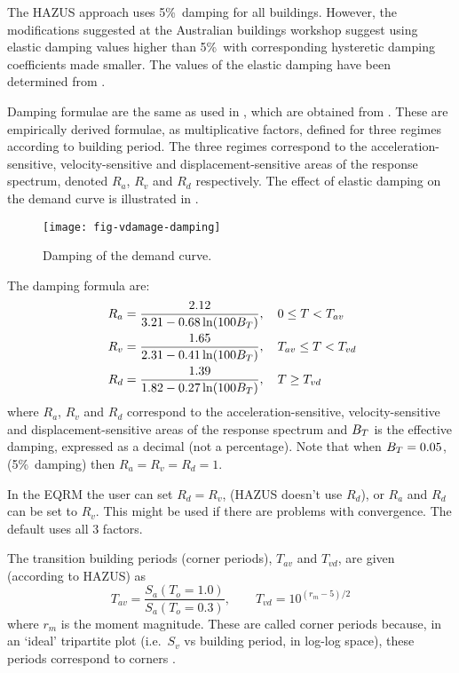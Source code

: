 The HAZUS approach uses 5\%\ damping for all buildings. However,
the modifications suggested at the Australian buildings workshop
\citep{dr_Stehle01a} suggest using elastic damping values higher
than 5\%\ with corresponding hysteretic damping coefficients made
smaller. The values of the elastic damping have been determined
from \cite{Newmark82}.

Damping formulae are the same as used in \cite{dr_FEMA99b}, which
are obtained from \cite{Newmark82}. These are empirically derived
formulae, as multiplicative factors, defined for three regimes
according to building period. The three regimes correspond to the
acceleration-sensitive, velocity-sensitive and
displacement-sensitive areas of the response spectrum, denoted
$R_a$, $R_v$ and $R_d$ respectively. The effect of elastic damping
on the demand curve is illustrated in
.

\begin{figure}[htp]
\centering
{}
\texttt{[image: fig-vdamage-damping]}
\caption{Damping of the demand curve.}
\label{fig:v-dam-damping-adrs}
\end{figure}


The damping formula are:
\begin{align}
 R_a &= \frac{2.12}{3.21-0.68\ln(100\Beff)}, \quad 0\le T < T_{av}\\
\hspace{0.3em}
 R_v &= \frac{1.65}{2.31-0.41\ln(100\Beff)}, \quad T_{av}\le T < T_{vd}\\
\hspace{0.3em}
 R_d &= \frac{1.39}{1.82-0.27\ln(100\Beff)}, \quad T \ge T_{vd}
\end{align}
where $R_a$, $R_v$ and $R_d$ correspond to the
acceleration-sensitive, velocity-sensitive and
displacement-sensitive areas of the response spectrum and $\Beff$ is the effective damping,
expressed as a decimal (not a percentage). Note that when $\Beff =
0.05$, (5\%\ damping) then $R_a=R_v=R_d=1$.

In the EQRM the user can set $R_d=R_v$, (HAZUS doesn't use $R_d$), or
$R_a$ and $R_d$ can be set to $R_v$. This might
be used if there are problems with convergence. The default
 uses all 3 factors.


The transition building periods (corner periods), $T_{av}$ and $T_{vd}$,
are given (according to HAZUS) as
\begin{equation}
 T_{av} = \frac{S_a(T_o =1.0)}{S_a(T_o =0.3)},
\qquad
 T_{vd} = 10^{(r_m-5)/2}
\end{equation}
where $r_m$ is the moment magnitude. These are called corner
periods because, in an `ideal' tripartite plot (i.e.~$S_v$ vs
building period, in log-log space), these periods correspond to
corners \citep{Newmark82}.

